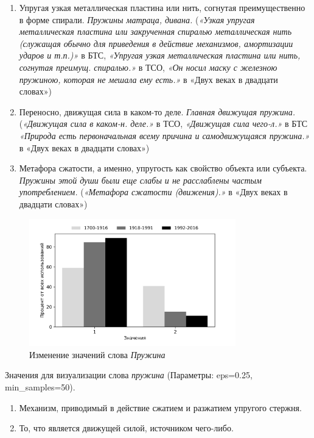 \begin{enumerate}
    \item Упругая узкая металлическая пластина или нить, согнутая преимущественно в форме спирали. \textit{Пружины матраца, дивана.}
(\textit{«Узкая упругая металлическая пластина или закрученная спиралью металлическая нить
(служащая обычно для приведения в действие механизмов, амортизации ударов и т.п.)»} в БТС,
\textit{«Упругая узкая металлическая пластина или нить, согнутая преимущ. спиралью.»} в ТСО,
\textit{«Он носил маску с железною пружиною, которая не мешала ему есть.»} в «Двух веках в двадцати словах»)

    \item Переносно, движущая сила в каком-то деле. \textit{Главная движущая пружина.}
(\textit{«Движущая сила в каком-н. деле.»} в ТСО, \textit{«Движущая сила чего-л.»} в БТС
\textit{«Природа есть первоначальная всему причина и самодвижущаяся пружина.»} в «Двух веках в двадцати словах»)

    \item Метафора сжатости, а именно, упругость как свойство объекта или субъекта. \textit{Пружины этой души были еще слабы и не расслаблены частым употреблением.}
(\textit{«Метафора сжатости (движения).»} в «Двух веках в двадцати словах»)
\end{enumerate}

\begin{figure}[H]
	\centering
	\includegraphics[width=0.8\textwidth]{img/visualizations/pruzhina_minimal}
	\caption{Изменение значений слова \textit{Пружина}}
	\label{fig:Пружина}
\end{figure}

Значения для визуализации слова \textit{пружина} (Параметры: eps=0.25, min\_samples=50).

\begin{enumerate}
    \item Механизм, приводимый в действие сжатием и разжатием упругого стержня.
    \item То, что является движущей силой, источником чего-либо.
\end{enumerate}

